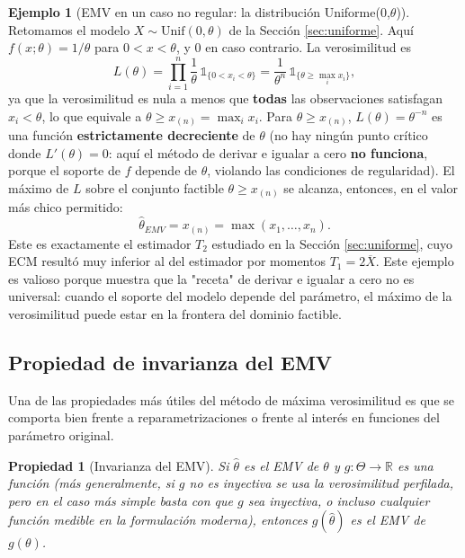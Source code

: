 \documentclass[11pt,a4paper]{article}
\theoremstyle{plain}
\newtheorem{propiedad}[teorema]{Propiedad}
\theoremstyle{definition}
\newtheorem{ejemplo}[teorema]{Ejemplo}
\theoremstyle{remark}
\begin{document}
\begin{ejemplo}[EMV en un caso no regular: la distribución Uniforme(0,\texorpdfstring{$\theta$}{theta})]
Retomamos el modelo $X\sim\text{Unif}(0,\theta)$ de la Sección \ref{sec:uniforme}. Aquí $f(x;\theta)=1/\theta$ para $0<x<\theta$, y $0$ en caso contrario. La verosimilitud es
\[
L(\theta) = \prod_{i=1}^n \frac1\theta\, \mathbb{1}_{\{0<x_i<\theta\}} = \frac{1}{\theta^n}\,\mathbb{1}_{\{\theta\ge \max_i x_i\}},
\]
ya que la verosimilitud es nula a menos que \textbf{todas} las observaciones satisfagan $x_i<\theta$, lo que equivale a $\theta \ge x_{(n)}=\max_i x_i$. Para $\theta\ge x_{(n)}$, $L(\theta)=\theta^{-n}$ es una función \textbf{estrictamente decreciente} de $\theta$ (no hay ningún punto crítico donde $L'(\theta)=0$: aquí el método de derivar e igualar a cero \textbf{no funciona}, porque el soporte de $f$ depende de $\theta$, violando las condiciones de regularidad). El máximo de $L$ sobre el conjunto factible $\theta\ge x_{(n)}$ se alcanza, entonces, en el valor más chico permitido:
\[
\widehat\theta_{EMV} = x_{(n)} = \max(x_1,\dots,x_n).
\]
Este es exactamente el estimador $T_2$ estudiado en la Sección \ref{sec:uniforme}, cuyo ECM resultó muy inferior al del estimador por momentos $T_1=2\overline X$. Este ejemplo es valioso porque muestra que la "receta" de derivar e igualar a cero no es universal: cuando el soporte del modelo depende del parámetro, el máximo de la verosimilitud puede estar en la frontera del dominio factible.
\end{ejemplo}

\subsection{Propiedad de invarianza del EMV}

Una de las propiedades más útiles del método de máxima verosimilitud es que se comporta bien frente a reparametrizaciones o frente al interés en funciones del parámetro original.

\begin{propiedad}[Invarianza del EMV]
Si $\widehat\theta$ es el EMV de $\theta$ y $g:\Theta\to\mathbb{R}$ es una función (más generalmente, si $g$ no es inyectiva se usa la verosimilitud perfilada, pero en el caso más simple basta con que $g$ sea inyectiva, o incluso cualquier función medible en la formulación moderna), entonces $g(\widehat\theta)$ es el EMV de $g(\theta)$.
\end{propiedad}
\end{document}
